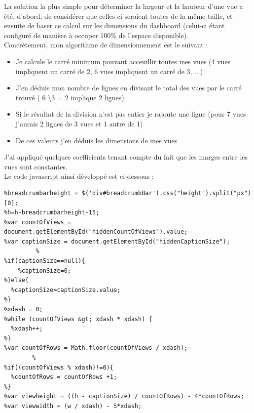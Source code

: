 La solution la plus simple pour déterminer la largeur et la hauteur d'une vue a été, d'abord, de considérer que celles-ci seraient toutes de la même taille, et ensuite de baser ce calcul sur les dimensions du dashboard (celui-ci étant configuré de manière à occuper 100\% de l'espace disponible).\\
Concrètement, mon algorithme de dimensionnement est le suivant :
\begin{itemize}
	\item Je calcule le carré minimum pouvant acceuillir toutes mes vues (4 vues impliquent un carré de 2, 6 vues impliquent un carré de 3, ...)
	\item J'en déduis mon nombre de lignes en divisant le total des vues par le carré trouvé ( 6 \textbackslash 3 = 2 implique 2 lignes)
	\item Si le résultat de la division n'est pas entier je rajoute une ligne (pour 7 vues j'aurais 2 lignes de 3 vues et 1 autre de 1)
	\item De ces valeurs j'en déduis les dimensions de mes vues
\end{itemize}

J'ai appliqué quelques coefficients tenant compte du fait que les marges entre les vues sont constantes.\\
Le code javascript ainsi développé est ci-dessous :

\begin{lstlisting}
%breadcrumbarheight = $('div#breadcrumbBar').css("height").split("px")[0];
%h=h-breadcrumbarheight-15;
%var countOfViews = document.getElementById("hiddenCountOfViews").value;
%var captionSize = document.getElementById("hiddenCaptionSize");
         %
%if(captionSize==null){
	%captionSize=0;
%}else{
  %captionSize=captionSize.value;
%}
%xdash = 0;
%while (countOfViews &gt; xdash * xdash) {
  %xdash++;
%}
%var countOfRows = Math.floor(countOfViews / xdash);
        %
%if((countOfViews % xdash)!=0){
  %countOfRows = countOfRows +1;
%}
%var viewheight = ((h - captionSize) / countOfRows) - 4*countOfRows;
%var viewwidth = (w / xdash) - 5*xdash;
\end{lstlisting}

